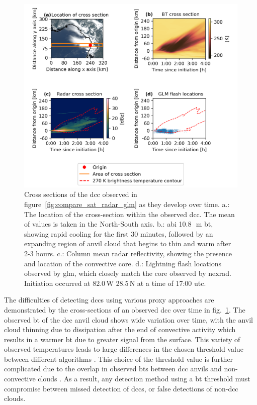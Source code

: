 \begin{figure}[tp]
    \includegraphics[width=\textwidth]{figures/chapter1_02.png}
    \caption[
    Cross sections of the \acrshort{dcc} observed in figure~\ref{fig:compare_sat_radar_glm} as they develop over time
    ]{
    Cross sections of the \acrshort{dcc} observed in figure~\ref{fig:compare_sat_radar_glm} as they develop over time. a.: The location of the cross-section within the observed \acrshort{dcc}. The mean of values is taken in the North-South axis. b.: \acrshort{abi} 10.8\,\unit{\mu m} \acrshort{bt}, showing rapid cooling for the first 30 minutes, followed by an expanding region of anvil cloud that begins to thin and warm after 2-3 hours. c.: Column mean radar reflectivity, showing the presence and location of the convective core. d.: Lightning flash locations observed by \acrshort{glm}, which closely match the core observed by \acrshort{nexrad}. Initiation occurred at 82.0\,\textdegree W 28.5\,\textdegree N at a time of 17:00 \acrshort{utc}.
    }
    \label{fig:dcc_over_time}
\end{figure}


The difficulties of detecting \acrshort{dcc}s using various proxy approaches are demonstrated by the cross-sections of an observed \acrshort{dcc} over time in fig.~\ref{fig:dcc_over_time}.
The observed \acrshort{bt} of the \acrshort{dcc} anvil cloud shows wide variation over time, with the anvil cloud thinning due to dissipation after the end of convective activity which results in a warmer \acrshort{bt} due to greater signal from the surface.
This variety of observed temperatures leads to large differences in the chosen threshold value between different algorithms \citep[see discussion in][]{bennartz_convective_2012}.
This choice of the threshold value is further complicated due to the overlap in observed \acrshort{bt}s between \acrshort{dcc} anvils and non-convective clouds \citep{konduru_new_2013}.
As a result, any detection method using a \acrshort{bt} threshold must compromise between missed detection of \acrshort{dcc}s, or false detections of non-\acrshort{dcc} clouds.

